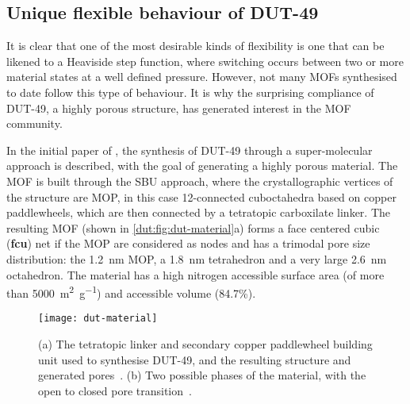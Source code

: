 \subsection{Unique flexible behaviour of DUT-49}

It is clear that one of the most desirable kinds of flexibility
is one that can be likened to a Heaviside step function, 
where switching occurs between two or more material states at a
well defined pressure. However, not many
\glspl{MOF} synthesised to date follow this type of behaviour.
It is why the surprising compliance of DUT-49, a highly porous 
structure, has generated interest in the \gls{MOF} community.

In the initial paper of \citet{stoeckHighlyPorousMetal2012}, the 
synthesis of DUT-49 through a super-molecular approach is 
described, with the goal of generating a highly porous material. 
The \gls{MOF} is built through the \gls{SBU} approach, where the crystallographic
vertices of the structure are \gls{MOP}, in this case 12-connected cuboctahedra
based on copper paddlewheels, which are then connected by a tetratopic
carboxilate linker. The resulting \gls{MOF} (shown in \autoref{dut:fig:dut-material}a) 
forms a face centered cubic 
(\textbf{fcu}) net if the \gls{MOP} are considered as nodes and has a 
trimodal pore size distribution: the \SI{1.2}{\nano\metre} \gls{MOP}, 
a \SI{1.8}{\nano\metre}
tetrahedron and a very large \SI{2.6}{\nano\metre} octahedron.
The material has a high nitrogen accessible surface area (of more
than \SI{5000}{\metre^2\per\gram}) and accessible volume (84.7\%).

\begin{figure}[htb]
    \centering
    \texttt{[image: dut-material]}%
    \caption{(a) The tetratopic linker and secondary copper 
    paddlewheel building unit used to synthesise DUT-49, 
    and the resulting structure and generated 
    pores~\cite{stoeckHighlyPorousMetal2012}. (b)
    Two possible phases of the material, with the 
    open to closed pore 
    transition~\cite{krausePressureamplifyingFrameworkMaterial2016}.
    }\label{dut:fig:dut-material}
\end{figure}

